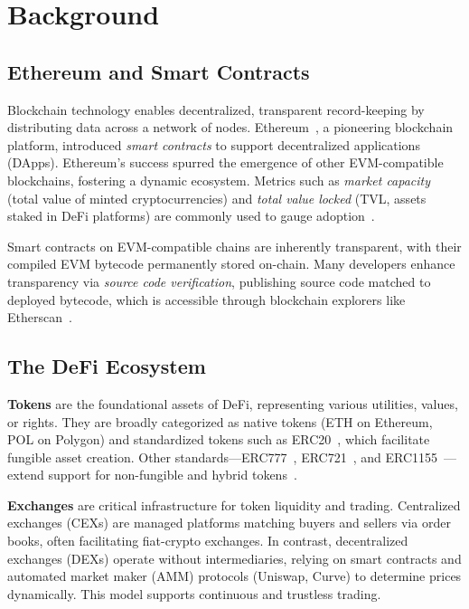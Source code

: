 \section{Background}

\subsection{Ethereum and Smart Contracts}
Blockchain technology enables decentralized, transparent record-keeping by distributing data across a network of nodes. Ethereum~\cite{ethereum-whitepaper}, a pioneering blockchain platform, introduced \textit{smart contracts} to support decentralized applications (DApps). Ethereum's success spurred the emergence of other EVM-compatible blockchains, fostering a dynamic ecosystem. Metrics such as \textit{market capacity} (total value of minted cryptocurrencies) and \textit{total value locked} (TVL, assets staked in DeFi platforms) are commonly used to gauge adoption~\cite{coingecko}.

Smart contracts on EVM-compatible chains are inherently transparent, with their compiled EVM bytecode permanently stored on-chain. Many developers enhance transparency via \textit{source code verification}, publishing source code matched to deployed bytecode, which is accessible through blockchain explorers like Etherscan~\cite{etherscan}.

\vspace{-3mm}
\subsection{The DeFi Ecosystem}
\vspace{-1mm}

\textbf{Tokens} are the foundational assets of DeFi, representing various utilities, values, or rights. They are broadly categorized as native tokens (\eg ETH on Ethereum, POL on Polygon) and standardized tokens such as ERC20~\cite{erc20}, which facilitate fungible asset creation. Other standards—ERC777~\cite{erc777}, ERC721~\cite{erc721}, and ERC1155~\cite{erc1155}—extend support for non-fungible and hybrid tokens~\cite{erc777,erc721,erc1155}.

\textbf{Exchanges} are critical infrastructure for token liquidity and trading. Centralized exchanges (CEXs) are managed platforms matching buyers and sellers via order books, often facilitating fiat-crypto exchanges. In contrast, decentralized exchanges (DEXs) operate without intermediaries, relying on smart contracts and automated market maker (AMM) protocols (\eg Uniswap, Curve) to determine prices dynamically. This model supports continuous and trustless trading.

